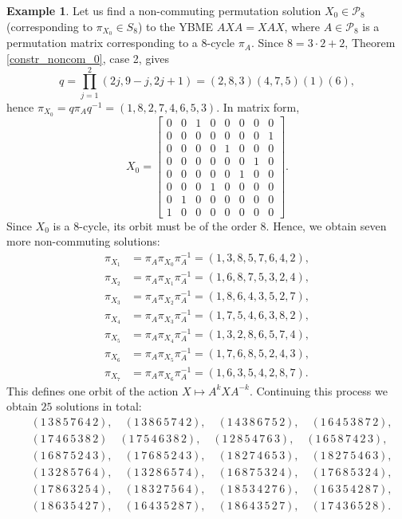 \documentclass{article}
\theoremstyle{definition}\newtheorem{example}{Example}[section]
\def\P{{\mathcal{P}}}
\begin{document}
	\begin{example}\label{Ex_8}
		Let us find a non-commuting permutation solution $X_0\in\P_8$ (corresponding to $\pi_{X_0}\in S_8$) to the YBME $AXA=XAX$, where $A\in\P_8$ is a permutation matrix corresponding to a $8$-cycle $\pi_A$. Since $8=3\cdot 2+2$, Theorem \ref{constr_noncom_0}, case 2, gives
		$$q=\prod_{j=1}^{2}(2j, 9-j, 2j+1)=(2,8,3)(4,7,5)(1)(6),$$
		hence $\pi_{X_0}=q\pi_A q^{-1}=(1,8,2,7,4,6,5,3).$ In matrix form,
		$$X_0=\left[\begin{array}{cccccccc}
			0 & 0 & 1 & 0 & 0 & 0 & 0 & 0 \\
			0 & 0 & 0 & 0 & 0 & 0 & 0 & 1 \\
			0 & 0 & 0 & 0 & 1 & 0 & 0 & 0 \\
			0 & 0 & 0 & 0 & 0 & 0 & 1 & 0 \\
			0 & 0 & 0 & 0 & 0 & 1 & 0 & 0 \\
			0 & 0 & 0 & 1 & 0 & 0 & 0 & 0 \\
			0 & 1 & 0 & 0 & 0 & 0 & 0 & 0 \\
			1 & 0 & 0 & 0 & 0 & 0 & 0 & 0
		\end{array}\right].$$
		Since $X_0$ is a $8$-cycle, its orbit must be of the order $8$. Hence, we obtain seven more non-commuting solutions:
		\begin{align*}
			\pi_{X_1} &=\pi_A \pi_{X_0}\pi_A^{-1}=(1,3,8,5,7,6,4,2),\\
			\pi_{X_2} &=\pi_A \pi_{X_1}\pi_A^{-1}=(1,6,8,7,5,3,2,4),\\
			\pi_{X_3} &=\pi_A \pi_{X_2}\pi_A^{-1}=(1,8,6,4,3,5,2,7),\\
			\pi_{X_4} &=\pi_A \pi_{X_3}\pi_A^{-1}=(1,7,5,4,6,3,8,2),\\
			\pi_{X_5} &=\pi_A \pi_{X_4}\pi_A^{-1}=(1,3,2,8,6,5,7,4),\\
			\pi_{X_6} &=\pi_A \pi_{X_5}\pi_A^{-1}=(1,7,6,8,5,2,4,3),\\
			\pi_{X_7} &=\pi_A \pi_{X_6}\pi_A^{-1}=(1,6,3,5,4,2,8,7).
		\end{align*}
		This defines one orbit of the action $X\mapsto A^kXA^{-k}$. Continuing this process we obtain $25$ solutions in total:
	 $$\begin{aligned}&(1\,3\,8\,5\,7\,6\,4\,2),\quad (1\,3\,8\,6\,5\,7\,4\,2),\quad (1\,4\,3\,8\,6\,7\,5\,2),\quad (1\,6\,4\,5\,3\,8\,7\,2),\\
	 &(1\,7\,4\,6\,5\,3\,8\,2)\quad (1\,7\,5\,4\,6\,3\,8\,2),\quad (1\,2\,8\,5\,4\,7\,6\,3),\quad (1\,6\,5\,8\,7\,4\,2\,3),\\ 
	 &(1\,6\,8\,7\,5\,2\,4\,3),\quad  (1\,7\,6\,8\,5\,2\,4\,3),\quad (1\,8\,2\,7\,4\,6\,5\,3),\quad (1\,8\,2\,7\,5\,4\,6\,3),\\
	&(1\,3\,2\,8\,5\,7\,6\,4),\quad (1\,3\,2\,8\,6\,5\,7\,4),\quad (1\,6\,8\,7\,5\,3\,2\,4),\quad (1\,7\,6\,8\,5\,3\,2\,4),\\
	&(1\,7\,8\,6\,3\,2\,5\,4),\quad  (1\,8\,3\,2\,7\,5\,6\,4),\quad (1\,8\,5\,3\,4\,2\,7\,6),\quad (1\,6\,3\,5\,4\,2\,8\,7),\\
	&(1\,8\,6\,3\,5\,4\,2\,7),\quad  (1\,6\,4\,3\,5\,2\,8\,7),\quad (1\,8\,6\,4\,3\,5\,2\,7),\quad(1\,7\,4\,3\,6\,5\,2\,8).\end{aligned}$$
		

\end{example}
\end{document}
